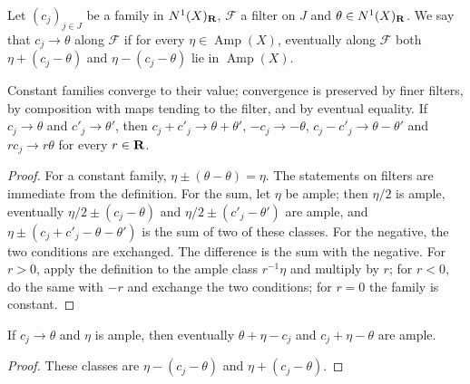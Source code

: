 \begin{definition}
\label{def:var-ample-convergence}
\leanok
{}
Let $(c_j)_{j\in J}$ be a family in $N^1(X)_{\mathbf{R}}$, $\mathcal F$ a filter on $J$ and
$\theta\in N^1(X)_{\mathbf{R}}$. We say that $c_j\to\theta$ along $\mathcal F$ if for every
$\eta\in\operatorname{Amp}(X)$, eventually along $\mathcal F$ both $\eta+(c_j-\theta)$ and
$\eta-(c_j-\theta)$ lie in $\operatorname{Amp}(X)$.
\end{definition}

\begin{lemma}[Limits]
\label{lem:var-ample-convergence-algebra}
\leanok
{}
Constant families converge to their value; convergence is preserved by finer filters, by
composition with maps tending to the filter, and by eventual equality. If $c_j\to\theta$ and
$c'_j\to\theta'$, then $c_j+c'_j\to\theta+\theta'$, $-c_j\to-\theta$, $c_j-c'_j\to\theta-\theta'$
and $rc_j\to r\theta$ for every $r\in\mathbf{R}$.
\end{lemma}
\begin{proof}
For a constant family, $\eta\pm(\theta-\theta)=\eta$. The statements on filters are immediate
from the definition. For the sum, let $\eta$ be ample; then $\eta/2$ is ample, eventually
$\eta/2\pm(c_j-\theta)$ and $\eta/2\pm(c'_j-\theta')$ are ample, and
$\eta\pm(c_j+c'_j-\theta-\theta')$ is the sum of two of these classes. For the negative, the two
conditions are exchanged. The difference is the sum with the negative. For $r>0$, apply the
definition to the ample class $r^{-1}\eta$ and multiply by $r$; for $r<0$, do the same with
$-r$ and exchange the two conditions; for $r=0$ the family is constant.
\end{proof}

\begin{lemma}
\label{lem:var-ample-convergence-openness}
\leanok
{}
If $c_j\to\theta$ and $\eta$ is ample, then eventually $\theta+\eta-c_j$ and $c_j+\eta-\theta$
are ample.
\end{lemma}
\begin{proof}
These classes are $\eta-(c_j-\theta)$ and $\eta+(c_j-\theta)$.
\end{proof}

